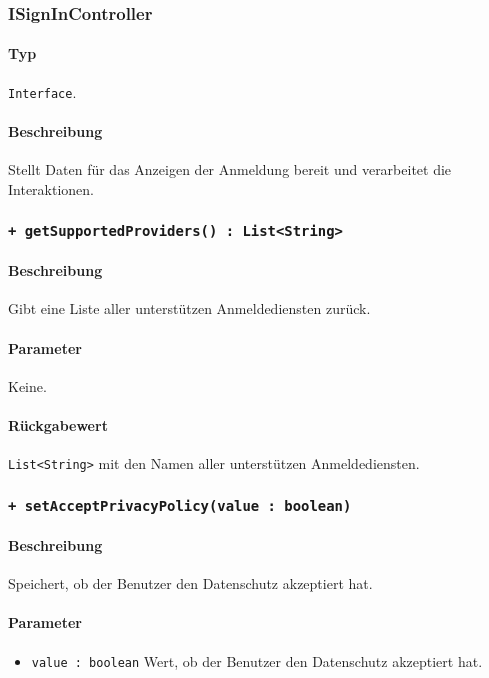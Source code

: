 \subsubsection{ISignInController}\label{App_Signup_ISignInController}
\paragraph*{Typ}
\texttt{Interface}.
\paragraph*{Beschreibung}
Stellt Daten für das Anzeigen der Anmeldung bereit und verarbeitet die Interaktionen.

\subsubsection{\texttt{+ getSupportedProviders() : List<String>}}\label{App_Signup_ISignInController_getSupportedProviders}%
\paragraph*{Beschreibung}
Gibt eine Liste aller unterstützen Anmeldediensten zurück.
\paragraph*{Parameter}
Keine.
\paragraph*{Rückgabewert}
\texttt{List<String>} mit den Namen aller unterstützen Anmeldediensten.

\subsubsection{\texttt{+ setAcceptPrivacyPolicy(value : boolean)}}\label{App_Signup_ISignInController_setAcceptPrivacyPolicy}%
\paragraph*{Beschreibung}
Speichert, ob der Benutzer den Datenschutz akzeptiert hat.
\paragraph*{Parameter}
\begin{itemize}
    \item \texttt{value : boolean} Wert, ob der Benutzer den Datenschutz akzeptiert hat.
\end{itemize}

